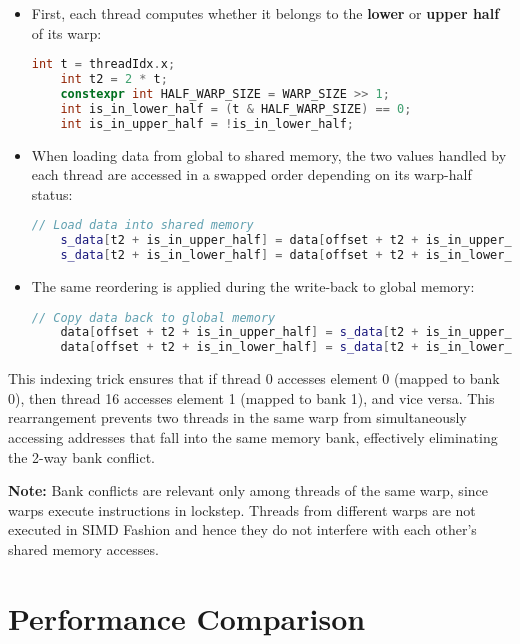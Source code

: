 \documentclass{article}
\begin{document}
\begin{itemize}
    \item First, each thread computes whether it belongs to the \textbf{lower} or \textbf{upper half} of its warp:
    \begin{lstlisting}[language=C++, numbers=none]
    int t = threadIdx.x;
    int t2 = 2 * t;
    constexpr int HALF_WARP_SIZE = WARP_SIZE >> 1;
    int is_in_lower_half = (t & HALF_WARP_SIZE) == 0;
    int is_in_upper_half = !is_in_lower_half;
    \end{lstlisting}

    \item When loading data from global to shared memory, the two values handled by each thread are accessed in a swapped order depending on its warp-half status:
    \begin{lstlisting}[language=C++, numbers=none]
    // Load data into shared memory
    s_data[t2 + is_in_upper_half] = data[offset + t2 + is_in_upper_half];
    s_data[t2 + is_in_lower_half] = data[offset + t2 + is_in_lower_half];
    \end{lstlisting}

    \item The same reordering is applied during the write-back to global memory:
    \begin{lstlisting}[language=C++, numbers=none]
    // Copy data back to global memory
    data[offset + t2 + is_in_upper_half] = s_data[t2 + is_in_upper_half];
    data[offset + t2 + is_in_lower_half] = s_data[t2 + is_in_lower_half];
    \end{lstlisting}
\end{itemize}

This indexing trick ensures that if thread 0 accesses element 0 (mapped to bank 0), then thread 16 accesses 
element 1 (mapped to bank 1), and vice versa. This rearrangement prevents two threads in the same warp from 
simultaneously accessing addresses that fall into the same memory bank, effectively eliminating the 2-way bank
conflict.

\medskip
\noindent\textbf{Note:} Bank conflicts are relevant only among threads of the same warp, since warps execute 
instructions in lockstep. Threads from different warps are not executed in SIMD Fashion and hence they do not
interfere with each other's shared memory accesses.



\section*{Performance Comparison}
\end{document}
